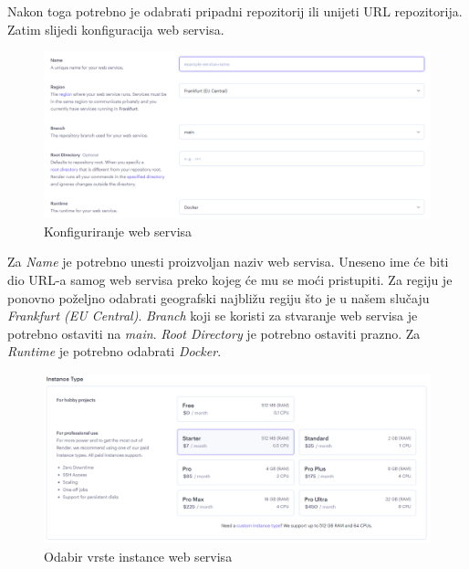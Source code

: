 			Nakon toga potrebno je odabrati pripadni repozitorij ili unijeti URL repozitorija. Zatim slijedi konfiguracija web servisa.
			
			\begin{figure}[H]
				\includegraphics[width=\textwidth]{slike/upute/konfiguriranjeWebServisa.png} %
				\caption{Konfiguriranje web servisa}
				\label{fig:konfiguriranjeWebServisa} %
			\end{figure}
			
			Za \textit{Name} je potrebno unesti proizvoljan naziv web servisa. Uneseno ime će biti dio URL-a samog web servisa preko kojeg će mu se moći pristupiti. Za regiju je ponovno poželjno odabrati geografski najbližu regiju što je u našem slučaju \textit{Frankfurt (EU Central)}. \textit{Branch} koji se koristi za stvaranje web servisa je potrebno ostaviti na \textit{main}. \textit{Root Directory} je potrebno ostaviti prazno. Za \textit{Runtime} je potrebno odabrati \textit{Docker}.
			
			\begin{figure}[H]
				\includegraphics[width=\textwidth]{slike/upute/webServisPlacanje.png} %
				\caption{Odabir vrste instance web servisa}
				\label{fig:webServisPlacanje} %
			\end{figure}
			
